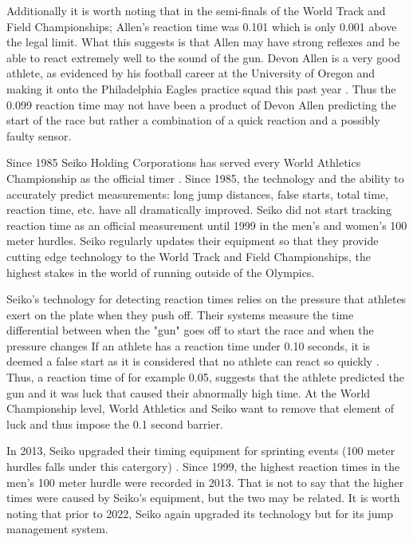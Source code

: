 \documentclass[12pt, letterpaper, titlepage]{article}
\begin{document}




Additionally it is worth noting that in the semi-finals of the World Track and
Field Championships; Allen's reaction time was 0.101 which is only 0.001 above
the legal limit.  What this suggests is that Allen may have strong reflexes
and be able to react extremely well to the sound of the gun.  Devon Allen is a
very good athlete, as evidenced by his football career at the University of Oregon
and making it onto the Philadelphia Eagles practice squad this past year \citep{Hurley}.
Thus the 0.099 reaction time may not have been a product of Devon Allen
predicting the start of the race but rather a combination of a quick reaction 
and a possibly faulty sensor.

Since 1985 Seiko Holding Corporations has served every World Athletics Championship
as the official timer \citep{Seiko}.  Since 1985, the technology and the ability
to accurately predict measurements: long jump distances, false starts, total time,
reaction time, etc. have all dramatically improved.  Seiko did not start tracking
reaction time as an official measurement until 1999 in the men's and women's 100 meter
hurdles.  Seiko regularly updates their equipment so that they provide cutting edge
technology to the World Track and Field Championships, the highest stakes in the world
of running outside of the Olympics.

Seiko's technology for detecting reaction times relies on the pressure that athletes
exert on the plate when they push off.  Their systems measure the time differential
between when the "gun" goes off to start the race and when the pressure changes 
\citep{Seiko}  If an athlete has a reaction time under 0.10 seconds, it is deemed a 
false start as it is considered that no athlete can react so quickly \citep{Seiko-Timing}.  
Thus, a reaction time of for example 0.05, suggests that the athlete predicted the gun and it
was luck that caused their abnormally high time.  At the World Championship level,
World Athletics and Seiko want to remove that element of luck and thus impose the 0.1
second barrier.

In 2013, Seiko upgraded their timing equipment for sprinting events (100 meter hurdles
falls under this catergory) \citep{WorldAthletics_2013}.  Since 1999, the highest reaction 
times in the men's 100 meter hurdle were recorded in 2013.  That is not to say that the higher 
times were caused by Seiko's equipment, but the two may be related.  It is worth noting that prior
to 2022, Seiko again upgraded its technology but for its jump management system.
\citep{Pilianidis}
\end{document}
